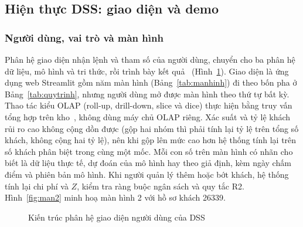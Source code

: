 \subsection{Hiện thực DSS: giao diện và demo}
\subsubsection{Người dùng, vai trò và màn hình}\label{sec:vaitro}
Phân hệ giao diện nhận lệnh và tham số của người dùng, chuyển cho ba phân hệ dữ liệu, mô hình và tri thức, rồi trình bày kết quả~\cite{turban2011} (Hình~\ref{fig:uims}). Giao diện là ứng dụng web Streamlit gồm năm màn hình (Bảng~\ref{tab:manhinh}) đi theo bốn pha ở Bảng~\ref{tab:quytrinh}, nhưng người dùng mở được màn hình theo thứ tự bất kỳ. Thao tác kiểu OLAP (roll-up, drill-down, slice và dice) thực hiện bằng truy vấn tổng hợp trên kho~\cite{kimball2013}, không dùng máy chủ OLAP riêng. Xác suất và tỷ lệ khách rủi ro cao không cộng dồn được (gộp hai nhóm thì phải tính lại tỷ lệ trên tổng số khách, không cộng hai tỷ lệ), nên khi gộp lên mức cao hơn hệ thống tính lại trên số khách phân biệt trong cùng một mốc. Mỗi con số trên màn hình có nhãn cho biết là dữ liệu thực tế, dự đoán của mô hình hay theo giả định, kèm ngày chấm điểm và phiên bản mô hình. Khi người quản lý thêm hoặc bớt khách, hệ thống tính lại chi phí và $Z$, kiểm tra ràng buộc ngân sách và quy tắc R2. Hình~\ref{fig:man2} minh hoạ màn hình 2 với hồ sơ khách 26339.

\begin{figure}[!htbp]
\centering

\caption{Kiến trúc phân hệ giao diện người dùng của DSS}
\label{fig:uims}
\end{figure}

